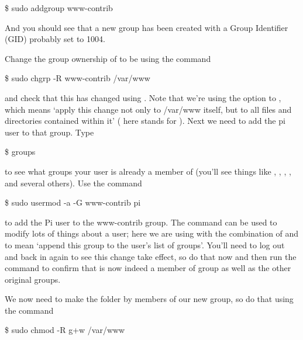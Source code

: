 \begin{ttoutenv}
\$ sudo addgroup www-contrib
\end{ttoutenv}

And you should see that a new group has been created with a Group Identifier (GID) probably set to 1004.

Change the group ownership of  to be  using the command

\begin{ttoutenv}
\$ sudo chgrp -R www-contrib /var/www
\end{ttoutenv}

and check that this has changed using . Note that we're using the  option to , which means `apply this change not only to /var/www itself, but to all files and directories contained within it' ( here stands for ). Next we need to add the pi user to that group. Type

\begin{ttoutenv}
\$ groups
\end{ttoutenv}

to see what groups your user is already a member of (you'll see things like , , , ,  and several others). Use the command

\begin{ttoutenv}
\$ sudo usermod -a -G www-contrib pi
\end{ttoutenv}

to add the Pi user to the www-contrib group. The  command can be used to modify lots of things about a user; here we are using with the combination of  and  to mean `append this group to the user's list of groups'. You'll need to log out and back in again to see this change take effect, so do that now and then run the  command to confirm that  is now indeed a member of group  as well as the other original groups.


We now need to make the  folder  by members of our new group, so do that using the command

\begin{ttoutenv}
\$ sudo chmod -R g+w /var/www
\end{ttoutenv}

